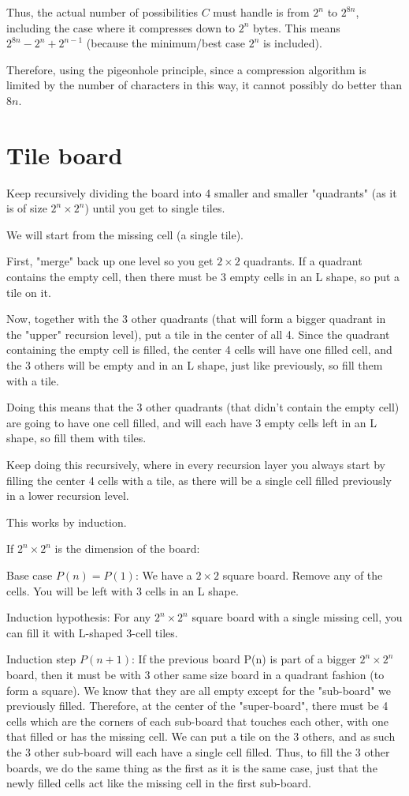 \documentclass[11pt,letterpaper]{article}
\begin{document}
		Thus, the actual number of possibilities $C$ must handle is from $2^n$ to $2^{8n}$, including the case where it compresses down to $2^n$ bytes.
		This means $2^{8n} - 2^n + 2^{n-1}$ (because the minimum/best case $2^n$ is included).
		
		Therefore, using the pigeonhole principle, since a compression algorithm is limited by the number of characters in this way, it cannot possibly do better than $8n$.
		
	\section{Tile board}
		Keep recursively dividing the board into 4 smaller and smaller "quadrants" (as it is of size $2^n \times 2^n$) until you get to single tiles.
		
		We will start from the missing cell (a single tile).
		
		First, "merge" back up one level so you get $2 \times 2$ quadrants.
		If a quadrant contains the empty cell, then there must be 3 empty cells in an L shape, so put a tile on it.
		
		Now, together with the 3 other quadrants (that will form a bigger quadrant in the "upper" recursion level), put a tile in the center of all 4.
		Since the quadrant containing the empty cell is filled, the center 4 cells will have one filled cell, and the 3 others will be empty and in an L shape, just like previously, so fill them with a tile.
		
		Doing this means that the 3 other quadrants (that didn't contain the empty cell) are going to have one cell filled, and will each have 3 empty cells left in an L shape, so fill them with tiles.
		
		Keep doing this recursively, where in every recursion layer you always start by filling the center 4 cells with a tile, as there will be a single cell filled previously in a lower recursion level.
		
		This works by induction.
		
		If $2^n \times 2^n$ is the dimension of the board:
		
		Base case $P(n)=P(1)$: We have a $2 \times 2$ square board. Remove any of the cells. You will be left with 3 cells in an L shape.
		
		Induction hypothesis: For any $2^n \times 2^n$ square board with a single missing cell, you can fill it with L-shaped 3-cell tiles.
		
		Induction step $P(n+1)$: If the previous board P(n) is part of a bigger $2^n \times 2^n$ board, then it must be with 3 other same size board in a quadrant fashion (to form a square). We know that they are all empty except for the "sub-board" we previously filled. Therefore, at the center of the "super-board", there must be 4 cells which are the corners of each sub-board that touches each other, with one that filled or has the missing cell. We can put a tile on the 3 others, and as such the 3 other sub-board will each have a single cell filled. Thus, to fill the 3 other boards, we do the same thing as the first as it is the same case, just that the newly filled cells act like the missing cell in the first sub-board.
	
\end{document}
